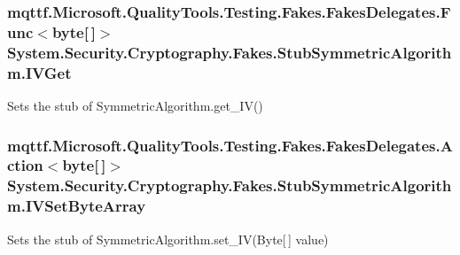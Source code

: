\hypertarget{class_system_1_1_security_1_1_cryptography_1_1_fakes_1_1_stub_symmetric_algorithm_a959c385e4b9e8464669d30e76ad59537}{
\subsubsection[{I\-V\-Get}]{\setlength{\rightskip}{0pt plus 5cm}mqttf.\-Microsoft.\-Quality\-Tools.\-Testing.\-Fakes.\-Fakes\-Delegates.\-Func$<$byte\mbox{[}$\,$\mbox{]}$>$ System.\-Security.\-Cryptography.\-Fakes.\-Stub\-Symmetric\-Algorithm.\-I\-V\-Get}}\label{class_system_1_1_security_1_1_cryptography_1_1_fakes_1_1_stub_symmetric_algorithm_a959c385e4b9e8464669d30e76ad59537}


Sets the stub of Symmetric\-Algorithm.\-get\-\_\-\-I\-V()

\hypertarget{class_system_1_1_security_1_1_cryptography_1_1_fakes_1_1_stub_symmetric_algorithm_a3ad047eaa1e5320c17168e9c024c5ab9}{
\subsubsection[{I\-V\-Set\-Byte\-Array}]{\setlength{\rightskip}{0pt plus 5cm}mqttf.\-Microsoft.\-Quality\-Tools.\-Testing.\-Fakes.\-Fakes\-Delegates.\-Action$<$byte\mbox{[}$\,$\mbox{]}$>$ System.\-Security.\-Cryptography.\-Fakes.\-Stub\-Symmetric\-Algorithm.\-I\-V\-Set\-Byte\-Array}}\label{class_system_1_1_security_1_1_cryptography_1_1_fakes_1_1_stub_symmetric_algorithm_a3ad047eaa1e5320c17168e9c024c5ab9}


Sets the stub of Symmetric\-Algorithm.\-set\-\_\-\-I\-V(\-Byte\mbox{[}$\,$\mbox{]} value)

